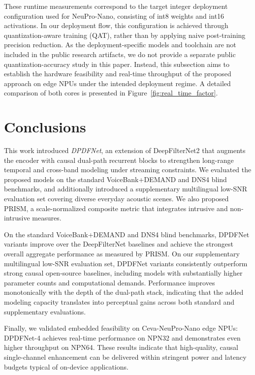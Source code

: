 \documentclass[final,5p,times,authoryear]{elsarticle}
\begin{document}
These runtime measurements correspond to the target integer deployment configuration used for NeuPro-Nano, consisting of int8 weights and int16 activations. In our deployment flow, this configuration is achieved through quantization-aware training (QAT), rather than by applying naive post-training precision reduction. As the deployment-specific models and toolchain are not included in the public research artifacts, we do not provide a separate public quantization-accuracy study in this paper. Instead, this subsection aims to establish the hardware feasibility and real-time throughput of the proposed approach on edge NPUs under the intended deployment regime.
%
A detailed comparison of both cores is presented in Figure~\ref{fig:real_time_factor}.


\section{Conclusions}
\label{sec:conclusions}

This work introduced \textit{DPDFNet}, an extension of DeepFilterNet2 that augments the encoder with causal dual-path recurrent blocks to strengthen long-range temporal and cross-band modeling under streaming constraints. We evaluated the proposed models on the standard VoiceBank+DEMAND and DNS4 blind benchmarks, and additionally introduced a supplementary multilingual low-SNR evaluation set covering diverse everyday acoustic scenes. We also proposed PRISM, a scale-normalized composite metric that integrates intrusive and non-intrusive measures.

On the standard VoiceBank+DEMAND and DNS4 blind benchmarks, DPDFNet variants improve over the DeepFilterNet baselines and achieve the strongest overall aggregate performance as measured by PRISM. On our supplementary multilingual low-SNR evaluation set, DPDFNet variants consistently outperform strong causal open-source baselines, including models with substantially higher parameter counts and computational demands. Performance improves monotonically with the depth of the dual-path stack, indicating that the added modeling capacity translates into perceptual gains across both standard and supplementary evaluations.

Finally, we validated embedded feasibility on Ceva-NeuPro\texttrademark-Nano edge NPUs: DPDFNet-4 achieves real-time performance on NPN32 and demonstrates even higher throughput on NPN64.
%
These results indicate that high-quality, causal single-channel enhancement can be delivered within stringent power and latency budgets typical of on-device applications.
\end{document}
